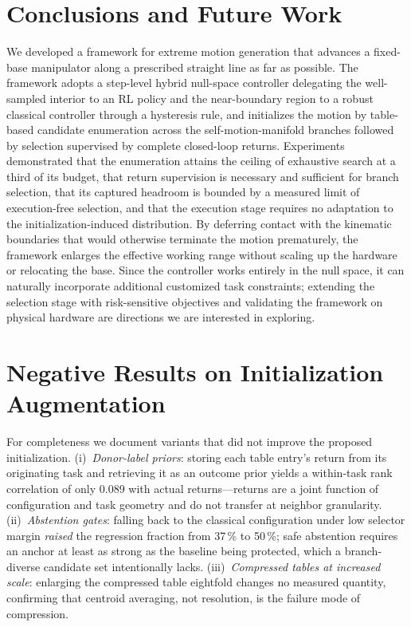 \documentclass[journal]{IEEEtran}
\begin{document}
\section{Conclusions and Future Work}
We developed a framework for extreme motion generation that advances a
fixed-base manipulator along a prescribed straight line as far as
possible. The framework adopts a step-level hybrid null-space
controller delegating the well-sampled interior to an RL policy and the
near-boundary region to a robust classical controller through a
hysteresis rule, and initializes the motion by table-based candidate
enumeration across the self-motion-manifold branches followed by
selection supervised by complete closed-loop returns. Experiments
demonstrated that the enumeration attains the ceiling of exhaustive
search at a third of its budget, that return supervision is necessary
and sufficient for branch selection, that its captured headroom is
bounded by a measured limit of execution-free selection, and that the
execution stage requires no adaptation to the initialization-induced
distribution. By deferring contact with the kinematic boundaries that
would otherwise terminate the motion prematurely, the framework
enlarges the effective working range without scaling up the hardware or
relocating the base. Since the controller works entirely in the null
space, it can naturally incorporate additional customized task
constraints; extending the selection stage with risk-sensitive
objectives and validating the framework on physical hardware are
directions we are interested in exploring.

\appendices
\section{Negative Results on Initialization Augmentation}
For completeness we document variants that did not improve the proposed
initialization. (i)~\textit{Donor-label priors}: storing each table
entry's return from its originating task and retrieving it as an
outcome prior yields a within-task rank correlation of only 0.089 with
actual returns---returns are a joint function of configuration and task
geometry and do not transfer at neighbor granularity. (ii)~\textit{Abstention
gates}: falling back to the classical configuration under low selector
margin \textit{raised} the regression fraction from 37\,\% to 50\,\%;
safe abstention requires an anchor at least as strong as the baseline
being protected, which a branch-diverse candidate set intentionally
lacks. (iii)~\textit{Compressed tables at increased scale}: enlarging
the compressed table eightfold changes no measured quantity, confirming
that centroid averaging, not resolution, is the failure mode of
compression.
\end{document}

